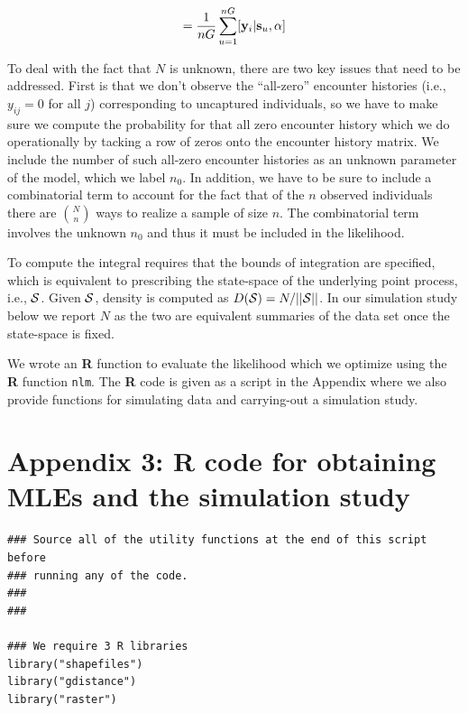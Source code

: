 \documentclass[12pt]{article}
\begin{document}
\begin{spacing}{1.2}
\begin{equation}
         [{\bf y}_{i}|\alpha] = \frac{1}{nG} \sum_{u=1}^{nG}  [ {\bf
            y}_{i} |{\bf s}_u, \alpha]
\label{mle.eq.intlik}
\end{equation}

To deal with the fact that $N$ is unknown, there are two key issues
that need to be addressed.  First is that we don't observe the
``all-zero'' encounter histories (i.e., $y_{ij} = 0$ for all $j$)
corresponding to uncaptured individuals, so we have to make sure we
compute the probability for that all zero encounter history which we
do operationally by tacking a row of zeros onto the encounter history
matrix. We include the number of such all-zero encounter histories as
an unknown parameter of the model, which we label $n_{0}$.  In
addition, we have to be sure to include a combinatorial term to
account for the fact that of the $n$ observed individuals there are
${N \choose n}$ ways to realize a sample of size $n$. The
combinatorial term involves the unknown $n_{0}$ and thus it must be
included in the likelihood.

To compute the integral requires that the bounds of integration are
specified, which is equivalent to prescribing the state-space of the
underlying point process, i.e., ${\cal S}$. Given ${\cal S}$, density
is
computed as $D({\cal S}) = N/||{\cal S}||$. In our simulation study
below we report $N$ as the two are equivalent summaries of the data
set once the state-space is fixed.

We wrote an {\bf R} function to evaluate the likelihood which we optimize
using the {\bf R} function \mbox{\tt nlm}.
The {\bf R} code is given as a script in the Appendix where we also
provide functions for simulating data and carrying-out a simulation study.



\section*{Appendix 3: {\bf R} code for obtaining MLEs and the
  simulation study}

{\small
\begin{verbatim}
### Source all of the utility functions at the end of this script before
### running any of the code. 
###
###

### We require 3 R libraries
library("shapefiles")
library("gdistance")
library("raster")


\end{verbatim}}
\end{spacing}
\end{document}

